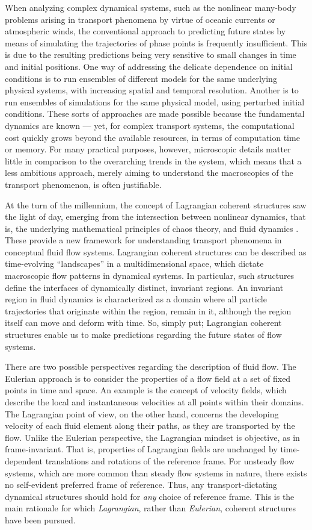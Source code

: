 When analyzing complex dynamical systems, such as the nonlinear many-body
problems arising in transport phenomena by virtue of oceanic currents or
atmospheric winds, the conventional approach to predicting future states
by means of simulating the trajectories of phase points is frequently
insufficient. This is due to the resulting predictions being very sensitive to
small changes in time and initial positions. One way of addressing the delicate
dependence on initial conditions is to run ensembles of different models for
the same underlying physical systems, with increasing spatial and temporal
resolution. Another is to run ensembles of simulations for the same physical
model, using perturbed initial conditions. These sorts of approaches are made
possible because the fundamental dynamics are known --- yet, for complex
transport systems, the computational cost quickly grows beyond the available
resources, in terms of computation time or memory. For many practical purposes,
however, microscopic details matter little in comparison to the overarching
trends in the system, which means that a less ambitious approach, merely aiming
to understand the macroscopics of the transport phenomenon, is often
justifiable.

At the turn of the millennium, the concept of Lagrangian coherent structures
saw the light of day, emerging from the intersection between nonlinear
dynamics, that is, the underlying mathematical principles of chaos theory, and
fluid dynamics \parencite{haller2000lagrangian}. These provide a new framework
for understanding transport phenomena in conceptual fluid flow systems.
Lagrangian coherent structures can be described as time-evolving ``landscapes''
in a multidimensional space, which dictate macroscopic flow patterns in
dynamical systems. In particular, such structures define the interfaces of
dynamically distinct, invariant regions. An invariant region in fluid dynamics
is characterized as a domain where all particle trajectories that originate
within the region, remain in it, although the region itself can move and deform
with time. So, simply put; Lagrangian coherent structures enable us to make
predictions regarding the future states of flow systems.

There are two possible perspectives regarding the description of fluid flow.
The Eulerian approach is to consider the properties of a flow field at a set of
fixed points in time and space. An example is the concept of velocity fields,
which describe the local and instantaneous velocities at all points within
their domains. The Lagrangian point of view, on the other hand, concerns the
developing velocity of each fluid element along their paths, as they are
transported by the flow. Unlike the Eulerian perspective, the Lagrangian
mindset is objective, as in frame-invariant. That is, properties of Lagrangian
fields are unchanged by time-dependent translations and rotations of the
reference frame. For unsteady flow systems, which are more common than steady
flow systems in nature, there exists no self-evident preferred frame of
reference. Thus, any transport-dictating dynamical structures should
hold for \emph{any} choice of reference frame. This is the main
rationale for which \emph{Lagrangian}, rather than \emph{Eulerian}, coherent
structures have been pursued.

